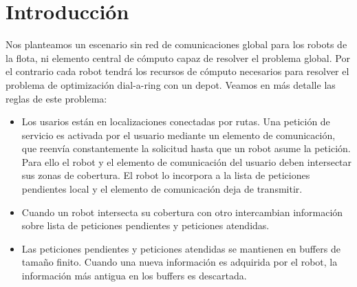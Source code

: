 \documentclass[preprint,12pt]{elsarticle}
\begin{document}
\linenumbers

\section{Introducción}

Nos planteamos un escenario sin red de comunicaciones global para los robots de la flota, ni elemento central de cómputo capaz de resolver el problema global. Por el contrario cada robot tendrá los recursos de cómputo necesarios para resolver el problema de optimización dial-a-ring con un depot. Veamos en más detalle las reglas de este problema:

\begin{itemize}

\item Los usarios están en localizaciones conectadas por rutas. Una petición de servicio es activada por el usuario mediante un elemento de comunicación, que reenvía constantemente la solicitud hasta que un robot asume la petición. Para ello el robot y el elemento de comunicación del usuario deben intersectar sus zonas de cobertura. El robot lo incorpora a la lista de peticiones pendientes local y el elemento de comunicación deja de transmitir.

\item Cuando un robot intersecta su cobertura con otro intercambian información sobre lista de peticiones pendientes y peticiones atendidas.

\item Las peticiones pendientes y peticiones atendidas se mantienen en buffers de tamaño finito. Cuando una nueva información es adquirida por el robot, la información más antigua en los buffers es descartada.


\end{itemize}
\end{document}
